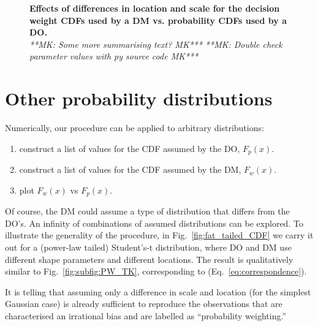 \documentclass[a4paper, 12pt]{article}
\newcommand{\eref}[1]{(Eq.~\ref{eq:#1})}
\newcommand{\flabel}[1]{\label{fig:#1}}
\newcommand{\fref}[1]{Fig.~\ref{fig:#1}}
\newcommand{\MK}[1]{{\it ***MK: #1 MK***}}
\begin{document}
\begin{figure}
\begin{center}
\caption{{\bf Effects of differences in location and scale for the decision weight CDFs used by a DM vs. probability CDFs used by a DO.}\\
\MK{Some more summarising text?}
\flabel{CDF_weights}
\MK{Double check parameter values with py source code}
}
\end{center}
\end{figure}



\section{Other probability distributions}
Numerically, our procedure can be applied to arbitrary distributions: 
\begin{enumerate}
\item
construct a list of values for the CDF assumed by the DO, $F_p(x)$.
\item
construct a list of values for the CDF assumed by the DM, $F_w(x)$.
\item
plot $F_w(x)$ vs $F_p(x)$.
\end{enumerate}
Of course, the DM could assume a type of distribution that differs from the DO's. An infinity of combinations of assumed distributions can be explored. To illustrate the generality of the procedure, in \fref{fat_tailed_CDF} we carry it out for a (power-law tailed) Student's-t distribution, where DO and DM use different shape parameters and different locations. The result is qualitatively similar to \fref{subfig:PW_TK}, corresponding to \eref{correspondence}. 

It is telling that assuming only a difference in scale and location (for the simplest Gaussian case) is already sufficient to reproduce the observations that are characterised an irrational bias and are labelled as ``probability weighting.''
\end{document}
